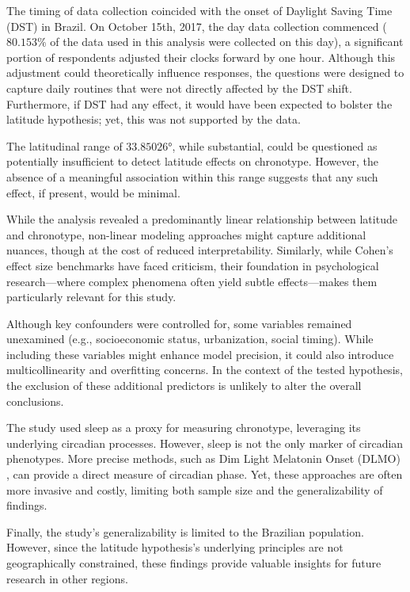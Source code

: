 \documentclass[
12pt,
openright,
oneside,
a4paper,
chapter=TITLE,
section=TITLE,
french,
spanish,
brazil,
english
]{abntex2}
\begin{document}
The timing of data collection coincided with the onset of Daylight
Saving Time (DST) in Brazil. On October 15th, 2017, the day data
collection commenced (\(80.153\%\) of the data used in this analysis
were collected on this day), a significant portion of respondents
adjusted their clocks forward by one hour. Although this adjustment
could theoretically influence responses, the questions were designed to
capture daily routines that were not directly affected by the DST shift.
Furthermore, if DST had any effect, it would have been expected to
bolster the latitude hypothesis; yet, this was not supported by the
data.

The latitudinal range of \(33.85026°\), while substantial, could be
questioned as potentially insufficient to detect latitude effects on
chronotype. However, the absence of a meaningful association within this
range suggests that any such effect, if present, would be minimal.

While the analysis revealed a predominantly linear relationship between
latitude and chronotype, non-linear modeling approaches might capture
additional nuances, though at the cost of reduced interpretability.
Similarly, while Cohen's effect size benchmarks have faced criticism,
their foundation in psychological research---where complex phenomena
often yield subtle effects---makes them particularly relevant for this
study.

Although key confounders were controlled for, some variables remained
unexamined (e.g., socioeconomic status, urbanization, social timing).
While including these variables might enhance model precision, it could
also introduce multicollinearity and overfitting concerns. In the
context of the tested hypothesis, the exclusion of these additional
predictors is unlikely to alter the overall conclusions.

The study used sleep as a proxy for measuring chronotype, leveraging its
underlying circadian processes. However, sleep is not the only marker of
circadian phenotypes. More precise methods, such as Dim Light Melatonin
Onset (DLMO) \autocite{ruiz2020}, can provide a direct measure of
circadian phase. Yet, these approaches are often more invasive and
costly, limiting both sample size and the generalizability of findings.

Finally, the study's generalizability is limited to the Brazilian
population. However, since the latitude hypothesis's underlying
principles are not geographically constrained, these findings provide
valuable insights for future research in other regions.
\end{document}
